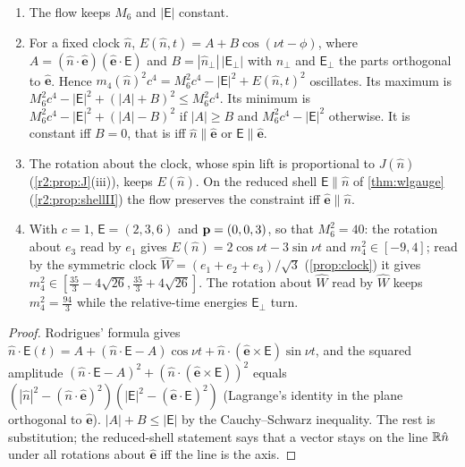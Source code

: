\begin{proposition}
\label{e6:prop:clock}
\begin{enumerate}[label=(\roman*),leftmargin=2.2em]
\item The flow keeps $M_6$ and $|\boldsymbol{\mathsf E}|$ constant.
\item For a fixed clock $\hat n$, $E(\hat n,t)=A+B\cos(\nu t-\phi)$, where $A=(\hat n\cdot\hat{\mathbf e})(\hat{\mathbf e}\cdot\boldsymbol{\mathsf E})$ and
$B=|\hat n_\perp|\,|\boldsymbol{\mathsf E}_\perp|$ with $\hat n_\perp$ and $\boldsymbol{\mathsf E}_\perp$ the parts orthogonal to $\hat{\mathbf e}$. Hence $m_4(\hat n)^2c^4=M_6^2c^4-|\boldsymbol{\mathsf E}|^2+E(\hat n,t)^2$ oscillates. Its maximum is
$M_6^2c^4-|\boldsymbol{\mathsf E}|^2+(|A|+B)^2\le M_6^2c^4$. Its minimum is $M_6^2c^4-|\boldsymbol{\mathsf E}|^2+(|A|-B)^2$ if $|A|\ge B$ and
$M_6^2c^4-|\boldsymbol{\mathsf E}|^2$ otherwise. It is constant iff $B=0$, that is iff $\hat n\parallel\hat{\mathbf e}$ or $\boldsymbol{\mathsf E}\parallel\hat{\mathbf e}$.
\item The rotation about the clock, whose spin lift is proportional to $J(\hat n)$ (\cref{r2:prop:J}(iii)), keeps $E(\hat n)$. On the reduced shell
$\boldsymbol{\mathsf E}\parallel \hat n$ of \cref{thm:wlgauge} (\cref{r2:prop:shellII}) the flow preserves the constraint iff $\hat{\mathbf e}\parallel \hat n$.
\item With $c=1$, $\boldsymbol{\mathsf E}=(2,3,6)$ and $\mathbf p=(0,0,3)$, so that $M_6^2=40$: the rotation about $e_3$ read by $e_1$ gives $E(\hat n)=2\cos\nu t-3\sin\nu t$ and
$m_4^2\in[-9,4]$; read by the symmetric clock $\widehat W=(e_1+e_2+e_3)/\sqrt3$ (\cref{prop:clock}) it gives $m_4^2\in[\tfrac{35}3-4\sqrt{26},\tfrac{35}3+4\sqrt{26}]$. The rotation about $\widehat W$ read by $\widehat W$ keeps
$m_4^2=\tfrac{94}3$ while the relative-time energies $\boldsymbol{\mathsf E}_\perp$ turn.
\end{enumerate}
\end{proposition}

\begin{proof}
Rodrigues' formula gives $\hat n\cdot\boldsymbol{\mathsf E}(t)=A+(\hat n\cdot\boldsymbol{\mathsf E}-A)\cos\nu t+\hat n\cdot(\hat{\mathbf e}\times\boldsymbol{\mathsf E})\sin\nu t$, and the squared
amplitude $(\hat n\cdot\boldsymbol{\mathsf E}-A)^2+(\hat n\cdot(\hat{\mathbf e}\times\boldsymbol{\mathsf E}))^2$ equals $(|\hat n|^2-(\hat n\cdot\hat{\mathbf e})^2)(|\boldsymbol{\mathsf E}|^2-(\hat{\mathbf e}\cdot\boldsymbol{\mathsf E})^2)$
(Lagrange's identity in the plane orthogonal to $\hat{\mathbf e}$). $|A|+B\le|\boldsymbol{\mathsf E}|$ by the Cauchy--Schwarz inequality. The rest is
substitution; the reduced-shell statement says that a vector stays on the line $\mathbb{R} \hat n$ under all rotations about $\hat{\mathbf e}$ iff the line is the axis.
\end{proof}

